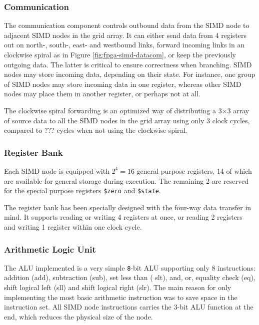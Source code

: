 \subsubsection{Communication}
The communication component controls outbound data from the \ac{SIMD} node to
adjacent \ac{SIMD} nodes in the grid array. It can either send data from 4
registers out on north-, south-, east- and westbound links, forward incoming
links in an clockwise spiral as in Figure \ref{fig:fpga-simd-datacom}, or keep
the previously outgoing data. The latter is critical to ensure correctness when
branching. \ac{SIMD} nodes may store incoming data, depending on their
state. For instance, one group of \ac{SIMD} nodes may store incoming data in one
register, whereas other \ac{SIMD} nodes may place them in another register, or
perhaps not at all.

The clockwise spiral forwarding is an optimized way of distributing a 3$\times$3
array of source data to all the \ac{SIMD} nodes in the grid array using only 3
clock cycles, compared to ??? cycles when not using the clockwise
spiral. 

\subsubsection{Register Bank}
Each \ac{SIMD} node is equipped with $2^4 = 16$ general purpose registers, 14 of
which are available for general storage during execution. The remaining 2 are
reserved for the special purpose registers {\tt \$zero} and {\tt \$state}.



The register bank has been specially designed with the four-way data transfer in
mind. It supports reading or writing 4 registers at once, or reading 2
registers and writing 1 register within one clock cycle.

\subsubsection{Arithmetic Logic Unit}

The \ac{ALU} implemented is a very simple {\tt 8}-bit \ac{ALU} supporting only 8
instructions: addition ({\sc add}), subtraction ({\sc sub}), set less than ({\sc
  slt}), {\sc and}, {\sc or}, equality check ({\sc eq}), shift logical left
({\sc sll}) and shift logical right ({\sc slr}). The main reason for only
implementing the most basic arithmetic instruction was to save space in the
instruction set. All \ac{SIMD} node instructions carries the 3-bit \ac{ALU}
function at the end, which reduces the physical size of the node.

